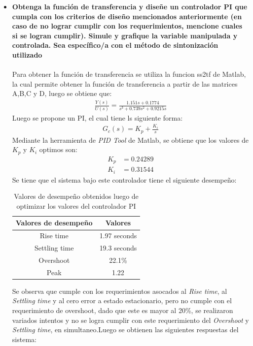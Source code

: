 \begin{itemize}
	\item  \textbf{Obtenga la función de transferencia y diseñe un controlador PI que cumpla con los criterios de diseño mencionados anteriormente (en caso de no lograr cumplir con los requerimientos, mencione cuales si se logran cumplir). Simule y grafique la variable manipulada y controlada. Sea específico/a con el método de sintonización utilizado}\\\\
	Para obtener la función de transferencia se utiliza la funcion ss2tf de Matlab, la cual permite obtener la función de transferencia a partir de las matrices A,B,C y D, luego se obtiene que:
	\begin{align}
		\frac{Y(s)}{U(s)} = \frac{1.151s+0.1774}{s^{3} + 0.739s^{2} + 0.9215s}
	\end{align}
	Luego se propone un PI, el cual tiene ls siguiente forma:
	\begin{align}
		G_{c}(s) = K_{p} + \frac{K_{i}}{s}
	\end{align}
	Mediante la herramienta de \textit{PID Tool} de Matlab, se obtiene que los valores de $K_{p}$ y $K_{i}$ optimos son:
	\begin{align}
		K_{p} &= 0.24289\\
		K_{i} &= 0.31544
	\end{align}
	Se tiene que el sistema bajo este controlador tiene el siguiente desempeño:
	\begin{table}[h!]
		\centering
		\begin{tabular}{|c|c|}
		\hline
		\textbf{Valores de desempeño} & \textbf{Valores} \\
		\hline
		Rise time & 1.97 seconds \\
		\hline
		Settling time & 19.3 seconds \\
		\hline
		Overshoot & 22.1\% \\
		\hline
		Peak & 1.22 \\
		\hline
		\end{tabular}
		\caption{Valores de desempeño obtenidos luego de optimizar los valores del controlador PI}
		\end{table}
	Se observa que cumple con los requerimientos asocados al \textit{Rise time}, al \textit{Settling time} y al cero error a estado estacionario, pero no cumple con el requerimiento de overshoot, dado que este es mayor al 20\%, se realizaron variados intentos y no se logra cumplir con este requerimiento del \textit{Overshoot} y \textit{Settling time}, en simultaneo.Luego se obtienen las siguientes respuestas del sistema:

\end{itemize}
